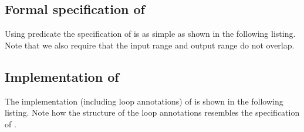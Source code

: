 
\subsection{Formal specification of \replacecopy}

Using predicate \Replace the specification of 
is as simple as shown in the following listing.
Note that we also require that the input range  and
output range  do not overlap.



\subsection{Implementation of \replacecopy}

The implementation (including loop annotations) of 
is shown in the following listing.
Note how the structure of the loop annotations resembles
the specification of .



\clearpage

